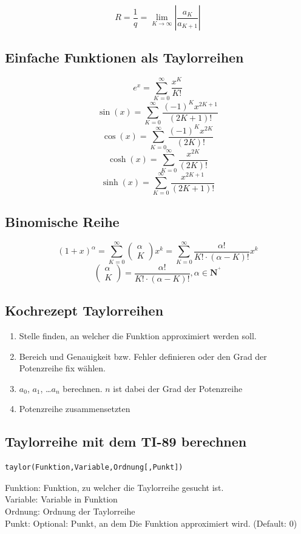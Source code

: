 \[ \boxed{R = \frac{1}{q} = \lim_{K \rightarrow \infty} \left| \frac{a_K}{a_{K + 1}} \right|} \]

\subsection{Einfache Funktionen als Taylorreihen}
\[ \boxed{e^x = \sum_{K=0}^{\infty} \frac{x^K}{K!}} \]
\[ \boxed{\sin(x) = \sum_{K=0}^{\infty} \frac{(-1)^K x^{2K+1}}{(2K+1)!}} \]
\[ \boxed{\cos(x) = \sum_{K=0}^{\infty} \frac{(-1)^K x^{2K}}{(2K)!}} \]
\[ \boxed{\cosh(x) = \sum_{K=0}^{\infty} \frac{x^{2K}}{(2K)!}} \]
\[ \boxed{\sinh(x) = \sum_{K=0}^{\infty} \frac{x^{2K+1}}{(2K+1)!}} \]

\subsection{Binomische Reihe}
\[ \boxed{(1 + x)^\alpha = \sum_{K=0}^{\infty}\left(\begin{matrix}\alpha\\K\end{matrix}\right)x^k = \sum_{K=0}^{\infty}\frac{\alpha !}{K! \cdot (\alpha - K)!}x^k} \]
\[ \boxed{\left(\begin{matrix}\alpha\\K\end{matrix}\right) = \frac{\alpha !}{K! \cdot (\alpha - K)!}, \alpha \in \mathbf{N}^{{}^{\ensuremath{\!+\!}}}_{} } \]

\subsection{Kochrezept Taylorreihen}
\begin{enumerate}
  \item Stelle finden, an welcher die Funktion approximiert werden soll. 
  \item Bereich und Genauigkeit bzw. Fehler definieren oder den Grad der Potenzreihe fix wählen. 
  \item $a_0$, $a_1$, \dots $a_n$ berechnen. $n$ ist dabei der Grad der Potenzreihe
  \item Potenzreihe zusammensetzten
\end{enumerate}

\ifti
\subsection{Taylorreihe mit dem TI-89 berechnen}
\begin{verbatim}
taylor(Funktion,Variable,Ordnung[,Punkt])
\end{verbatim}
Funktion: Funktion, zu welcher die Taylorreihe gesucht ist. \\
Variable: Variable in Funktion\\
Ordnung: Ordnung der Taylorreihe\\
Punkt: Optional: Punkt, an dem Die Funktion approximiert wird. (Default: 0)
\fi
\ifnspire
